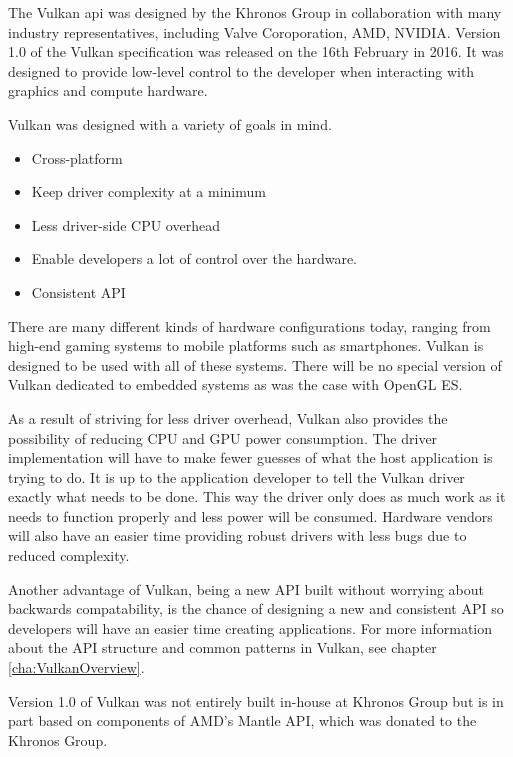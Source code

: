     The Vulkan \acrfull{api} was designed by the Khronos Group in collaboration with many industry representatives, including Valve Coroporation, AMD, NVIDIA. Version 1.0 of the Vulkan specification was released on the 16th February in 2016. It was designed to provide low-level control to the developer when interacting with graphics and compute hardware.

    Vulkan was designed with a variety of goals in mind.

    \begin{itemize}
      \item Cross-platform
      \item Keep driver complexity at a minimum
      \item Less driver-side CPU overhead
      \item Enable developers a lot of control over the hardware.
      \item Consistent API
    \end{itemize}

    There are many different kinds of hardware configurations today, ranging from high-end gaming systems to mobile platforms such as smartphones. Vulkan is designed to be used with all of these systems. There will be no special version of Vulkan dedicated to embedded systems as was the case with OpenGL ES.

    As a result of striving for less driver overhead, Vulkan also provides the possibility of reducing CPU and GPU power consumption. The driver implementation will have to make fewer guesses of what the host application is trying to do. It is up to the application developer to tell the Vulkan driver exactly what needs to be done. This way the driver only does as much work as it needs to function properly and less power will be consumed. Hardware vendors will also have an easier time providing robust drivers with less bugs due to reduced complexity.

    Another advantage of Vulkan, being a new API built without worrying about backwards compatability, is the chance of designing a new and consistent API so developers will have an easier time creating applications. For more information about the API structure and common patterns in Vulkan, see chapter \ref{cha:VulkanOverview}.

    Version 1.0 of Vulkan was not entirely built in-house at Khronos Group but is in part based on components of AMD's Mantle API, which was donated to the Khronos Group.


